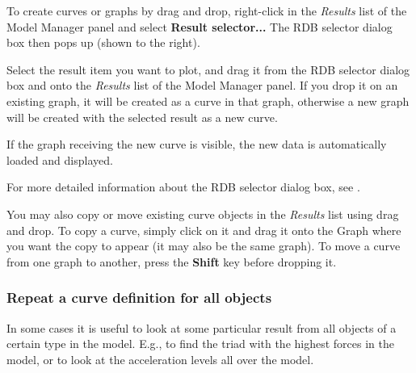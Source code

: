 To create curves or graphs by drag and drop, right-click in the {\sl Results}
list of the Model Manager panel and select \textbf{Result selector...}
The RDB selector dialog box then pops up (shown to the right).

Select the result item you want to plot, and drag it from the RDB selector
dialog box and onto the {\sl Results} list of the Model Manager panel. If you
drop it on an existing graph, it will be created as a curve in that graph,
otherwise a new graph will be created with the selected result as a new curve.

If the graph receiving the new curve \newline is visible,
the new data is automatically \newline loaded and displayed.

For more detailed information about the RDB selector dialog box, see
.

You may also copy or move existing curve objects in the {\sl Results} list
using drag and drop. To copy a curve, simply click on it and drag it onto the
Graph where you want the copy to appear (it may also be the same graph).
To move a curve from one graph to another, press the \textbf{Shift} key before
dropping it.

\subsubsection{Repeat a curve definition for all objects}

In some cases it is useful to look at some particular result from all objects
of a certain type in the model. E.g., to find the triad with the highest forces
in the model, or to look at the acceleration levels all over the model.


